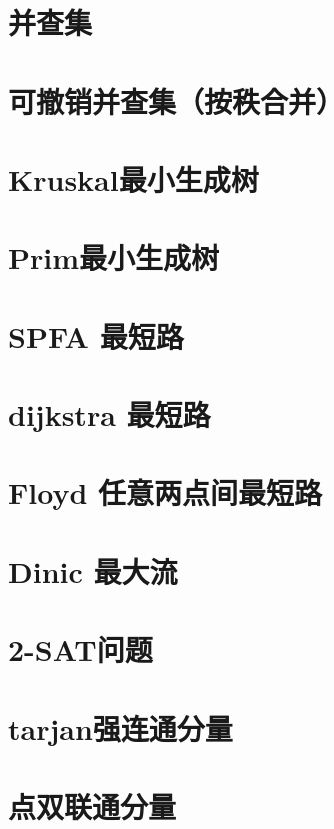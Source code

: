 \section{并查集}
\raggedbottom
\hrulefill
\section{可撤销并查集（按秩合并）}
\raggedbottom
\hrulefill
\section{Kruskal最小生成树}
\raggedbottom
\hrulefill
\section{Prim最小生成树}
\raggedbottom
\hrulefill
\section{SPFA 最短路}
\raggedbottom
\hrulefill
\section{dijkstra 最短路}
\raggedbottom
\hrulefill
\section{Floyd 任意两点间最短路}
\raggedbottom
\hrulefill
\section{Dinic 最大流}
\raggedbottom
\hrulefill
\section{2-SAT问题}
\raggedbottom
\hrulefill
\section{tarjan强连通分量}
\raggedbottom
\hrulefill
\section{点双联通分量}
\raggedbottom
\hrulefill
